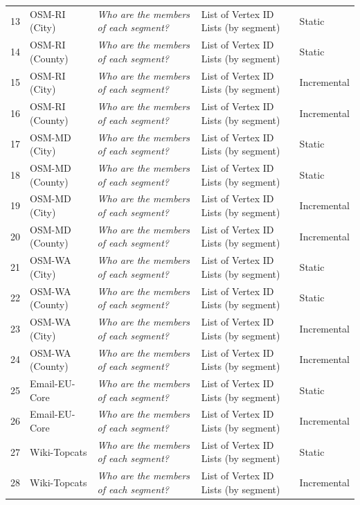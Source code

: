 \begin{table}[t]
\begin{center}
{\begin{tabular}{r|llll}
            13           & OSM-RI (City)       &\textit{Who are the members of each segment?} & List of Vertex ID Lists (by segment) & Static \\
            14           & OSM-RI (County)     &\textit{Who are the members of each segment?} & List of Vertex ID Lists (by segment) & Static \\
            15           & OSM-RI (City)       &\textit{Who are the members of each segment?} & List of Vertex ID Lists (by segment) & Incremental \\
            16           & OSM-RI (County)     &\textit{Who are the members of each segment?} & List of Vertex ID Lists (by segment) & Incremental \\
            17           & OSM-MD (City)       &\textit{Who are the members of each segment?} & List of Vertex ID Lists (by segment) & Static \\
            18           & OSM-MD (County)     &\textit{Who are the members of each segment?} & List of Vertex ID Lists (by segment) & Static \\
            19           & OSM-MD (City)       &\textit{Who are the members of each segment?} & List of Vertex ID Lists (by segment) & Incremental \\
            20           & OSM-MD (County)     &\textit{Who are the members of each segment?} & List of Vertex ID Lists (by segment) & Incremental \\
            21           & OSM-WA (City)       &\textit{Who are the members of each segment?} & List of Vertex ID Lists (by segment) & Static \\
            22           & OSM-WA (County)     &\textit{Who are the members of each segment?} & List of Vertex ID Lists (by segment) & Static \\
            23           & OSM-WA (City)       &\textit{Who are the members of each segment?} & List of Vertex ID Lists (by segment) & Incremental \\
            24           & OSM-WA (County)     &\textit{Who are the members of each segment?} & List of Vertex ID Lists (by segment) & Incremental \\
            25           & Email-EU-Core       &\textit{Who are the members of each segment?} & List of Vertex ID Lists (by segment) & Static \\
            26           & Email-EU-Core       &\textit{Who are the members of each segment?} & List of Vertex ID Lists (by segment) & Incremental \\
            27           & Wiki-Topcats       &\textit{Who are the members of each segment?} & List of Vertex ID Lists (by segment)  & Static \\
            28           & Wiki-Topcats        &\textit{Who are the members of each segment?} & List of Vertex ID Lists (by segment) & Incremental \\




\end{tabular}}
\end{center}
\end{table}
